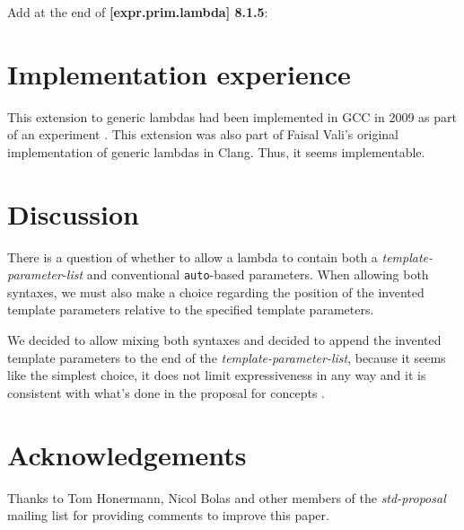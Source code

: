 \documentclass{wg21}
\newcommand{\cc}[1]{\texttt{#1}}
\begin{document}
Add at the end of \textbf{[expr.prim.lambda] 8.1.5}:
\begin{quote}
\end{quote}


\section{Implementation experience}
This extension to generic lambdas had been implemented in GCC in 2009 as part
of an experiment \cite{GCC}. This extension was also part of Faisal Vali's
original implementation of generic lambdas in Clang. Thus, it seems implementable.


\section{Discussion} \label{discussion}
There is a question of whether to allow a lambda to contain both a
\textit{template-parameter-list} and conventional \cc{auto}-based parameters.
When allowing both syntaxes, we must also make a choice regarding the position
of the invented template parameters relative to the specified template parameters.

We decided to allow mixing both syntaxes and decided to append the invented
template parameters to the end of the \textit{template-parameter-list}, because
it seems like the simplest choice, it does not limit expressiveness in any way
and it is consistent with what's done in the proposal for concepts \cite{N4553}.


\section{Acknowledgements}
Thanks to Tom Honermann, Nicol Bolas and other members of the \textit{std-proposal}
mailing list for providing comments to improve this paper.
\end{document}
